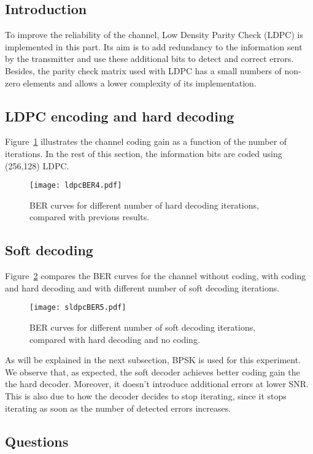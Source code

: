 \subsection{Introduction}
To improve the reliability of the channel, Low Density Parity Check (LDPC) is implemented in this part. Its aim is to add redundancy to the information sent by the transmitter and use these additional bits to detect and correct errors. Besides, the parity check matrix used with LDPC has a small numbers of non-zero elements and allows a lower complexity of its implementation.
\subsection{LDPC encoding and hard decoding}
Figure~\ref{fig:ldpcBER} illustrates the channel coding gain as a function of the number of iterations.
In the rest of this section, the information bits are coded using (256,128) LDPC.
\begin{figure}[htbp]
    \centering
    \texttt{[image: ldpcBER4.pdf]}
    \caption{BER curves for different number of hard decoding iterations, compared with previous results.\label{fig:ldpcBER}}
\end{figure}

\subsection{Soft decoding}
Figure~\ref{fig:sldpcBER} compares the BER curves for the channel without coding, with coding and hard decoding and with different number of soft decoding iterations.
\begin{figure}[htbp]
    \centering
    \texttt{[image: sldpcBER5.pdf]}
    \caption{BER curves for different number of soft decoding iterations, compared with hard decoding and no coding.\label{fig:sldpcBER}}
\end{figure}
As will be explained in the next subsection, BPSK is used for this experiment.
We observe that, as expected, the soft decoder achieves better coding gain the the hard decoder. Moreover, it doesn't introduce additional errors at lower SNR. This is also due to how the decoder decides to stop iterating, since it stops iterating as soon as the number of detected errors increases.

\subsection{Questions}
